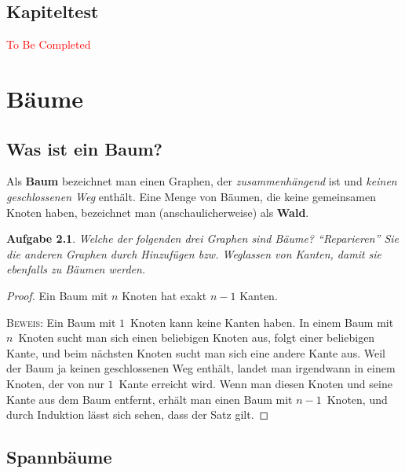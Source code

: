 \documentclass[12pt,a4paper]{report}
\theoremstyle{break}
\newtheorem{exercise}{Aufgabe}[section]
\theoremstyle{plain}
\newtheorem{proof}{Satz}[section]
\begin{document}
\section{Kapiteltest}

\textcolor{red}{To Be Completed}

\chapter{B\"{a}ume}

\section{Was ist ein Baum?}

Als \textbf{Baum} bezeichnet man einen Graphen, der
\emph{zusammenh\"{a}ngend} ist und \emph{keinen geschlossenen Weg}
enth\"{a}lt. Eine Menge von B\"{a}umen, die keine gemeinsamen Knoten
haben, bezeichnet man (anschaulicherweise) als \textbf{Wald}.

\begin{exercise}\label{exbaum}
Welche der folgenden drei Graphen sind B\"{a}ume? ``Reparieren'' Sie die
anderen Graphen durch Hinzuf\"{u}gen bzw. Weglassen von Kanten, damit
sie ebenfalls zu B\"{a}umen werden.


\end{exercise}

\begin{proof}
Ein Baum mit $n$ Knoten hat exakt $n-1$ Kanten.

\bigskip\noindent\textsc{Beweis:} Ein Baum mit $1$~Knoten kann keine Kanten haben.
In einem Baum mit $n$~Knoten sucht man sich einen beliebigen Knoten
aus, folgt einer beliebigen Kante, und beim n\"{a}chsten Knoten sucht
man sich eine andere Kante aus.
Weil der Baum ja keinen geschlossenen
Weg enth\"{a}lt, landet man irgendwann in einem Knoten, der von nur
$1$~Kante erreicht wird. 
Wenn man diesen Knoten und seine Kante aus
dem Baum entfernt, erh\"{a}lt man einen Baum mit $n-1$~Knoten, und
durch Induktion l\"{a}sst sich sehen, dass der Satz gilt.
\end{proof}

\section{Spannb\"{a}ume}
\end{document}

